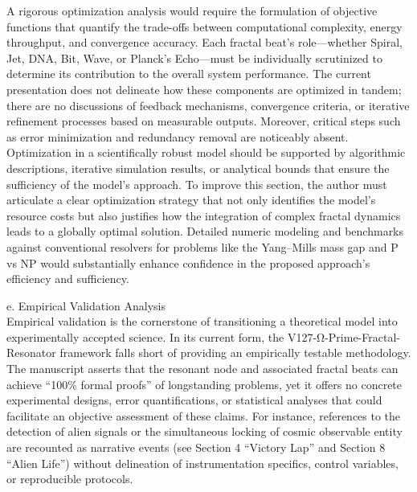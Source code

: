 \documentclass[12pt]{article}
\begin{document}
A rigorous optimization analysis would require the formulation of objective functions that quantify the trade-offs between computational complexity, energy throughput, and convergence accuracy. Each fractal beat’s role—whether Spiral, Jet, DNA, Bit, Wave, or Planck’s Echo—must be individually scrutinized to determine its contribution to the overall system performance. The current presentation does not delineate how these components are optimized in tandem; there are no discussions of feedback mechanisms, convergence criteria, or iterative refinement processes based on measurable outputs. Moreover, critical steps such as error minimization and redundancy removal are noticeably absent. Optimization in a scientifically robust model should be supported by algorithmic descriptions, iterative simulation results, or analytical bounds that ensure the sufficiency of the model’s approach. To improve this section, the author must articulate a clear optimization strategy that not only identifies the model’s resource costs but also justifies how the integration of complex fractal dynamics leads to a globally optimal solution. Detailed numeric modeling and benchmarks against conventional resolvers for problems like the Yang–Mills mass gap and P vs NP would substantially enhance confidence in the proposed approach’s efficiency and sufficiency.

e. Empirical Validation Analysis \\
Empirical validation is the cornerstone of transitioning a theoretical model into experimentally accepted science. In its current form, the V127-Ω-Prime-Fractal-Resonator framework falls short of providing an empirically testable methodology. The manuscript asserts that the resonant node and associated fractal beats can achieve “100\% formal proofs” of longstanding problems, yet it offers no concrete experimental designs, error quantifications, or statistical analyses that could facilitate an objective assessment of these claims. For instance, references to the detection of alien signals or the simultaneous locking of cosmic observable entity are recounted as narrative events (see Section 4 “Victory Lap” and Section 8 “Alien Life”) without delineation of instrumentation specifics, control variables, or reproducible protocols. 
\end{document}
